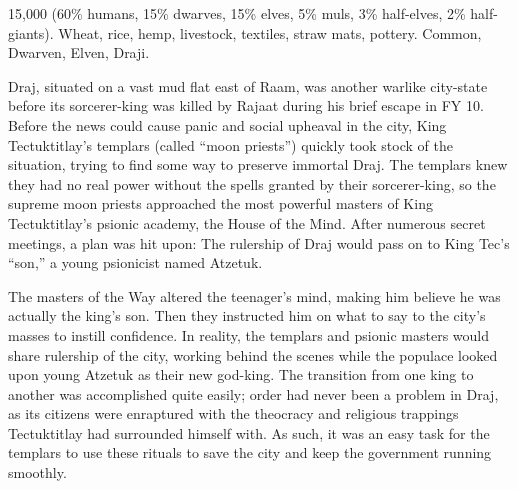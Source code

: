 {15,000 (60\% humans, 15\% dwarves, 15\% elves, 5\% muls, 3\% half-elves, 2\% half-giants).}
{Wheat, rice, hemp, livestock, textiles, straw mats, pottery.}
{Common, Dwarven, Elven, Draji.}
{
	Draj, situated on a vast mud flat east of Raam, was another warlike city-state before its sorcerer-king was killed by Rajaat during his brief escape in FY 10. Before the news could cause panic and social upheaval in the city, King Tectuktitlay's templars (called ``moon priests'') quickly took stock of the situation, trying to find some way to preserve immortal Draj. The templars knew they had no real power without the spells granted by their sorcerer-king, so the supreme moon priests approached the most powerful masters of King Tectuktitlay's psionic academy, the House of the Mind. After numerous secret meetings, a plan was hit upon: The rulership of Draj would pass on to King Tec's ``son,'' a young psionicist named Atzetuk.

	The masters of the Way altered the teenager's mind, making him believe he was actually the king's son. Then they instructed him on what to say to the city's masses to instill confidence. In reality, the templars and psionic masters would share rulership of the city, working behind the scenes while the populace looked upon young Atzetuk as their new god-king. The transition from one king to another was accomplished quite easily; order had never been a problem in Draj, as its citizens were enraptured with the theocracy and religious trappings Tectuktitlay had surrounded himself with. As such, it was an easy task for the templars to use these rituals to save the city and keep the government running smoothly.
}
